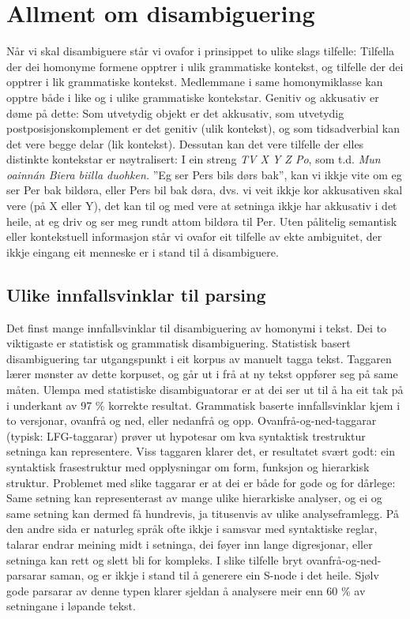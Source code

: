 \documentclass[a4paper,norsk]{article}
\begin{document}
\section{Allment om disambiguering}

Når vi skal disambiguere står vi ovafor i prinsippet to ulike slags tilfelle: Tilfella der dei homonyme formene opptrer i ulik grammatiske kontekst, og tilfelle der dei opptrer i lik grammatiske kontekst. Medlemmane i same homonymiklasse kan opptre både i like og i ulike grammatiske kontekstar. Genitiv og akkusativ er døme på dette: Som utvetydig objekt er det akkusativ, som utvetydig postposisjonskomplement er det genitiv (ulik kontekst), og som tidsadverbial kan det vere begge delar (lik kontekst). Dessutan kan det vere tilfelle der elles distinkte kontekstar er nøytralisert: I ein streng \textit{TV X Y Z Po}, som t.d. \textit{Mun oainnán Biera biilla duohken.} ''Eg ser Pers bils dørs bak'', kan vi ikkje vite om eg ser Per bak bildøra, eller Pers bil bak døra, dvs. vi veit ikkje kor akkusativen skal vere (på X eller Y), det kan til og med vere at setninga ikkje har akkusativ i det heile, at eg driv og ser meg rundt attom bildøra til Per. Uten pålitelig semantisk eller kontekstuell informasjon står vi ovafor eit tilfelle av ekte ambiguitet, der ikkje eingang eit menneske er i stand til å disambiguere.%


\subsection{Ulike innfallsvinklar til parsing}

Det finst mange innfallsvinklar til disambiguering av homonymi i tekst. Dei to viktigaste er statistisk og grammatisk disambiguering. Statistisk basert disambiguering tar utgangspunkt i eit korpus av manuelt tagga tekst. Taggaren lærer mønster av dette korpuset, og går ut i frå at ny tekst oppfører seg på same måten. Ulempa med statistiske disambiguatorar er at dei ser ut til å ha eit tak på i underkant av 97 \% korrekte resultat.  Grammatisk baserte innfallsvinklar kjem i to versjonar, ovanfrå og ned, eller nedanfrå og opp. Ovanfrå-og-ned-taggarar (typisk: LFG-taggarar) prøver ut hypotesar om kva syntaktisk trestruktur setninga kan representere. Viss taggaren klarer det, er resultatet svært godt: ein syntaktisk frasestruktur med opplysningar om form, funksjon og hierarkisk struktur. Problemet med slike taggarar er at dei er både for gode og for dårlege: Same setning kan representerast av mange ulike hierarkiske analyser, og ei og same setning kan dermed få hundrevis, ja titusenvis av ulike analyseframlegg. På den andre sida er naturleg språk ofte ikkje i samsvar med syntaktiske reglar, talarar endrar meining midt i setninga, dei føyer inn lange digresjonar, eller setninga kan rett og slett bli for kompleks. I slike tilfelle bryt ovanfrå-og-ned-parsarar saman, og er ikkje i stand til å generere ein S-node i det heile. Sjølv gode parsarar av denne typen klarer sjeldan å analysere meir enn 60 \% av setningane i løpande tekst.%
\end{document}
